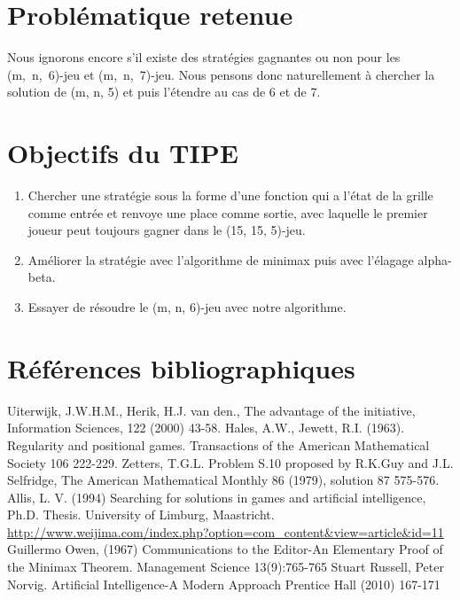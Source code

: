 \documentclass[12pt,a4paper]{article}
\begin{document}
\section*{\bfseries Problématique retenue}
\justify
\hspace*{7mm}Nous ignorons encore s'il existe des stratégies gagnantes ou non pour les \mbox{(m, n, 6)-jeu} et \mbox{(m, n, 7)-jeu}. Nous pensons donc naturellement à chercher la solution de (m, n, 5) et puis l'étendre au cas de 6 et de 7. 
\section*{\bfseries Objectifs du TIPE}
\begin{enumerate}
    \item Chercher une stratégie sous la forme d'une fonction qui a l'état de la grille comme entrée et renvoye une place comme sortie, avec laquelle le premier joueur peut toujours gagner dans le (15, 15, 5)-jeu.
    \item Améliorer la stratégie avec l'algorithme de minimax puis avec l'élagage alpha-beta.
    \item Essayer de résoudre le (m, n, 6)-jeu avec notre algorithme.
\end{enumerate}
\section*{\bfseries Références bibliographiques}
\begingroup
\renewcommand{\section}[2]{}%
\begin{thebibliography}{10}
    Uiterwijk, J.W.H.M., Herik, H.J. van den., The advantage of the initiative, Information Sciences, 122 (2000) 43-58.
    Hales, A.W., Jewett, R.I. (1963). Regularity and positional games. Transactions of the American Mathematical Society 106 222-229.
    Zetters, T.G.L. Problem S.10 proposed by R.K.Guy and J.L. Selfridge, The American Mathematical Monthly 86 (1979), solution 87 575-576.
    Allis, L. V. (1994) Searching for solutions in games and artificial intelligence, Ph.D. Thesis. University of Limburg, Maastricht.
    \url{http://www.weijima.com/index.php?option=com_content&view=article&id=11}
    Guillermo Owen, (1967) Communications to the Editor-An Elementary Proof of the Minimax Theorem. Management Science 13(9):765-765
    Stuart Russell, Peter Norvig. Artificial Intelligence-A Modern Approach Prentice Hall (2010) 167-171
\end{thebibliography}
\endgroup
\end{document}
